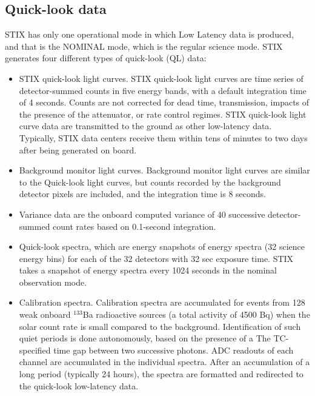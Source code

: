 \documentclass[referee]{aa} %
\begin{document}
\subsection{Quick-look data}
STIX has only one operational mode in which Low Latency data is produced, and that is the NOMINAL mode, which is the regular science mode.
STIX generates four different types of quick-look (QL) data:
\begin{itemize}
\item STIX quick-look light curves. 
STIX quick-look light curves are time series of detector-summed counts in five energy bands, with a default integration time of 4 seconds. 
Counts are not corrected for dead time,  transmission, impacts of the presence of the attenuator,  or rate control regimes. 
STIX quick-look light curve data are transmitted to the ground as other low-latency data. 
Typically, STIX data centers receive them within tens of minutes to two days after being generated on board.

\item Background monitor light curves. Background monitor light curves are similar to the Quick-look light curves, but
counts recorded by the background detector pixels are included, and the integration time is 8 seconds.
\item Variance data are the onboard computed variance of 40 successive detector-summed count rates
based on 0.1-second integration.
\item Quick-look spectra, which are energy snapshots of energy spectra (32 science energy bins) for
each of the 32 detectors with 32 sec exposure time.
STIX takes a snapshot of energy spectra every 1024
seconds in the nominal observation mode.
\item Calibration spectra. Calibration spectra are accumulated for events from 128 weak onboard $^{133}$Ba radioactive sources 
(a total activity of 4500 Bq) 
 when the solar count rate is small compared to the background.
Identification of such quiet periods is done autonomously, based on the presence of a
The TC-specified time gap between two successive photons.  
ADC readouts of each channel are accumulated in the individual spectra.
After an accumulation of a long period (typically 24 hours),  the spectra are 
formatted and redirected to the quick-look low-latency data.
\end{itemize}
\end{document}
